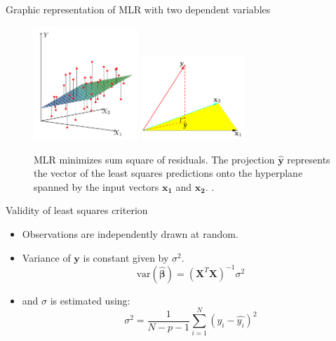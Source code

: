 \documentclass[aspectratio=169]{beamer}
\let \vec \mathbf
\begin{document}
\begin{frame}{Graphic representation of MLR with two dependent variables}
    \begin{figure}
        \centering
        \includegraphics[width=0.35\textwidth]{figures/fig3-1.pdf}
        \includegraphics[width=0.35\textwidth]{figures/fig3-2.pdf}
        \caption{MLR minimizes sum square of residuals. The projection $\vec{\hat{y}}$ represents the vector of the least squares predictions onto the hyperplane spanned by the input vectors $\vec{x_1}$ and $\vec{x_2}$. \cite{hastieElementsStatisticalLearning2016}.}
    \end{figure}
\end{frame}


\begin{frame}{Validity of least squares criterion}
    \begin{itemize}
        \item Observations are independently drawn at random.
        \item Variance of $\vec{y}$ is constant given by $\sigma^2$.
    \begin{equation*}
        \mathrm{var}(\hat{\bm{\beta}}) = (\vec{X}^T \vec{X})^{-1} \sigma^2
    \end{equation*}
    \item and $\sigma$ is estimated using:
    \begin{equation*}
        \sigma^2 = \frac{1}{N-p-1}\sum_{i=1}^N (y_i - \hat{y_i})^2
    \end{equation*}
    \end{itemize}
\end{frame}
\end{document}
